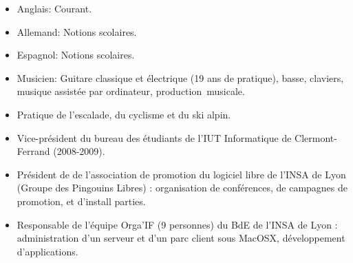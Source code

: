     \begin{itemize}
      \item Anglais: Courant.
      \item Allemand: Notions scolaires.
      \item Espagnol: Notions scolaires.
    \end{itemize}
\begin{itemize}
    \item Musicien: Guitare classique et électrique (19 ans de pratique), basse, claviers, musique assistée par ordinateur, production~musicale.
    \item Pratique de l'escalade, du cyclisme et du ski alpin.
    \item Vice-président du bureau des étudiants de l'IUT Informatique de Clermont-Ferrand (2008-2009).
    \item Président de de l'association de promotion du logiciel libre de l'INSA de Lyon (Groupe des Pingouins Libres) : organisation de conférences, de campagnes de promotion, et d'install parties.
    \item Responsable de l'équipe Orga'IF (9 personnes) du BdE de l'INSA de Lyon : administration d'un serveur et d'un parc client sous MacOSX, développement d'applications.
\end{itemize}

\vfill


